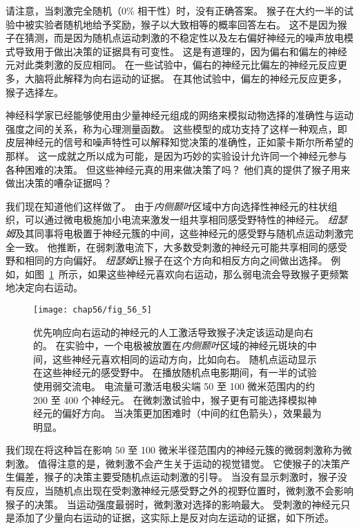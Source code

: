 请注意，当刺激完全随机（0\% 相干性）时，没有正确答案。
猴子在大约一半的试验中被实验者随机地给予奖励，猴子以大致相等的概率回答左右。
这不是因为猴子在猜测，而是因为随机点运动刺激的不稳定性以及左右偏好神经元的噪声放电模式导致用于做出决策的证据具有可变性。
这是有道理的，因为偏右和偏左的神经元对此类刺激的反应相同。
在一些试验中，偏右的神经元比偏左的神经元反应更多，大脑将此解释为向右运动的证据。
在其他试验中，偏左的神经元反应更多，猴子选择左。


神经科学家已经能够使用由少量神经元组成的网络来模拟动物选择的准确性与运动强度之间的关系，称为心理测量函数。
这些模型的成功支持了这样一种观点，即皮层神经元的信号和噪声特性可以解释知觉决策的准确性，正如蒙卡斯尔所希望的那样。
这一成就之所以成为可能，是因为巧妙的实验设计允许同一个神经元参与各种困难的决策。
但这些神经元真的用来做决策了吗？
他们真的提供了猴子用来做出决策的嘈杂证据吗？


我们现在知道他们这样做了。
由于\textit{内侧颞叶}区域中方向选择性神经元的柱状组织，可以通过微电极施加小电流来激发一组共享相同感受野特性的神经元。
\textit{纽瑟姆}及其同事将电极置于神经元簇的中间，这些神经元的感受野与随机点运动刺激完全一致。
他推断，在弱刺激电流下，大多数受刺激的神经元可能共享相同的感受野和相同的方向偏好。
\textit{纽瑟姆}让猴子在这个方向和相反方向之间做出选择。
例如，如图~\ref{fig:56_5}~所示，如果这些神经元喜欢向右运动，那么弱电流会导致猴子更频繁地决定向右运动。


\begin{figure}[htbp]
	\centering
	\texttt{[image: chap56/fig\_56\_5]}
	\caption{优先响应向右运动的神经元的人工激活导致猴子决定该运动是向右的。
		在实验中，一个电极被放置在\textit{内侧颞叶}区域的神经元斑块的中间，这些神经元喜欢相同的运动方向，比如向右。
		随机点运动显示在这些神经元的感受野中。
		在播放随机点电影期间，有一半的试验使用弱交流电。
		电流量可激活电极尖端 50 至 100 微米范围内的约 200 至 400 个神经元。
		在微刺激试验中，猴子更有可能选择模拟神经元的偏好方向。
		当决策更加困难时（中间的红色箭头），效果最为明显\cite{ditterich2003microstimulation}。}
	\label{fig:56_5}
\end{figure}


我们现在将这种旨在影响 50 至 100 微米半径范围内的神经元簇的微弱刺激称为微刺激。
值得注意的是，微刺激不会产生关于运动的视觉错觉。
它使猴子的决策产生偏差，猴子的决策主要受随机点运动刺激的引导。
当没有显示刺激时，猴子没有反应，当随机点出现在受刺激神经元感受野之外的视野位置时，微刺激不会影响猴子的决策。
当运动强度最弱时，微刺激对选择的影响最大。
受刺激的神经元只是添加了少量向右运动的证据，这实际上是反对向左运动的证据，如下所述。


